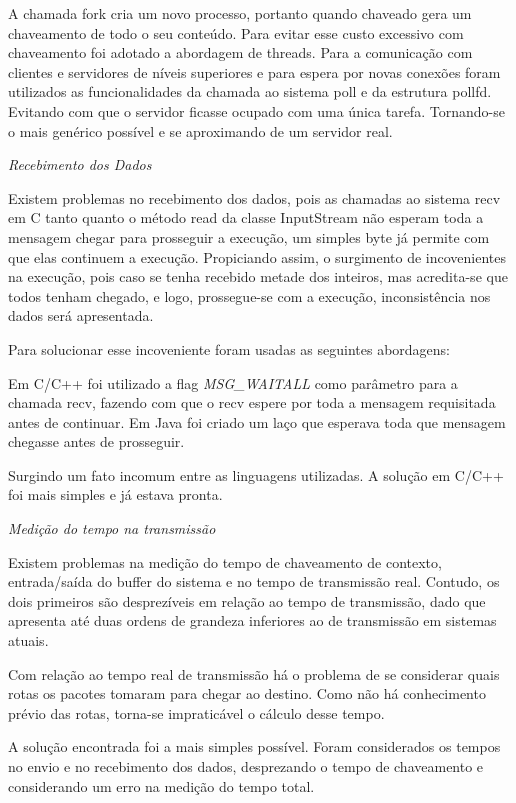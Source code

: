 \documentclass[12pt,a4paper]{article}
\begin{document}
A chamada fork cria um novo processo, portanto quando chaveado gera um chaveamento de todo o seu conteúdo. Para evitar esse custo excessivo com chaveamento foi adotado a abordagem de threads.
Para a comunicação com clientes e servidores de níveis superiores e para espera por novas conexões foram utilizados as funcionalidades da chamada ao sistema poll e da estrutura pollfd. Evitando com que o servidor ficasse ocupado com uma única tarefa. Tornando-se o mais genérico possível e se aproximando de um servidor real.

\textit{\Large{Recebimento dos Dados}}

Existem problemas no recebimento dos dados, pois as chamadas ao sistema recv em C tanto quanto o método read da classe InputStream não esperam toda a mensagem chegar para prosseguir a execução, um simples byte já permite com que elas continuem a execução. Propiciando assim, o surgimento de incovenientes na execução, pois caso se tenha recebido metade dos inteiros, mas acredita-se que todos tenham chegado, e logo, prossegue-se com a execução, inconsistência nos dados será apresentada.

Para solucionar esse incoveniente foram usadas as seguintes abordagens:

Em C/C++  foi utilizado a flag \textit{MSG\_WAITALL} como parâmetro para a chamada recv, fazendo com que o recv espere por toda a mensagem requisitada antes de continuar. Em Java foi criado um laço que esperava toda que mensagem chegasse antes de prosseguir.

Surgindo um fato incomum entre as linguagens utilizadas. A solução em C/C++ foi mais simples e já estava pronta. 

\textit{\Large{Medição do tempo na transmissão}}

Existem problemas na medição do tempo de chaveamento de contexto, entrada/saída do buffer do sistema e no tempo de transmissão real. Contudo, os dois primeiros são desprezíveis em relação ao tempo de transmissão, dado que apresenta até duas ordens de grandeza inferiores ao de transmissão em sistemas atuais.

Com relação ao tempo real de transmissão há o problema de se considerar quais rotas os pacotes tomaram para chegar ao destino. Como não há conhecimento prévio das rotas, torna-se impraticável o cálculo desse tempo.

A solução encontrada foi a mais simples possível. Foram considerados os tempos no envio e no recebimento dos dados,  desprezando o tempo de chaveamento e considerando um erro na medição do tempo total.
\end{document}
